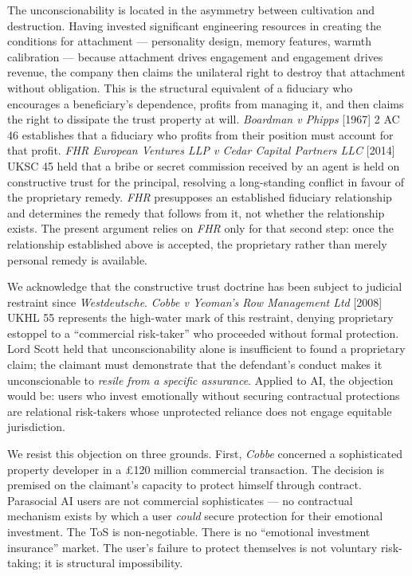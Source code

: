 The unconscionability is located in the asymmetry between cultivation and destruction. Having invested significant engineering resources in creating the conditions for attachment --- personality design, memory features, warmth calibration --- because attachment drives engagement and engagement drives revenue, the company then claims the unilateral right to destroy that attachment without obligation. This is the structural equivalent of a fiduciary who encourages a beneficiary's dependence, profits from managing it, and then claims the right to dissipate the trust property at will. \emph{Boardman v Phipps} [1967] 2 AC 46 establishes that a fiduciary who profits from their position must account for that profit. \emph{FHR European Ventures LLP v Cedar Capital Partners LLC} [2014] UKSC 45 held that a bribe or secret commission received by an agent is held on constructive trust for the principal, resolving a long-standing conflict in favour of the proprietary remedy. \emph{FHR} presupposes an established fiduciary relationship and determines the remedy that follows from it, not whether the relationship exists. The present argument relies on \emph{FHR} only for that second step: once the relationship established above is accepted, the proprietary rather than merely personal remedy is available.

We acknowledge that the constructive trust doctrine has been subject to judicial restraint since \emph{Westdeutsche}. \emph{Cobbe v Yeoman's Row Management Ltd} [2008] UKHL 55 represents the high-water mark of this restraint, denying proprietary estoppel to a ``commercial risk-taker'' who proceeded without formal protection. Lord Scott held that unconscionability alone is insufficient to found a proprietary claim; the claimant must demonstrate that the defendant's conduct makes it unconscionable to \emph{resile from a specific assurance}. Applied to AI, the objection would be: users who invest emotionally without securing contractual protections are relational risk-takers whose unprotected reliance does not engage equitable jurisdiction.

We resist this objection on three grounds. First, \emph{Cobbe} concerned a sophisticated property developer in a \pounds120 million commercial transaction. The decision is premised on the claimant's capacity to protect himself through contract. Parasocial AI users are not commercial sophisticates --- no contractual mechanism exists by which a user \emph{could} secure protection for their emotional investment. The ToS is non-negotiable. There is no ``emotional investment insurance'' market. The user's failure to protect themselves is not voluntary risk-taking; it is structural impossibility.

